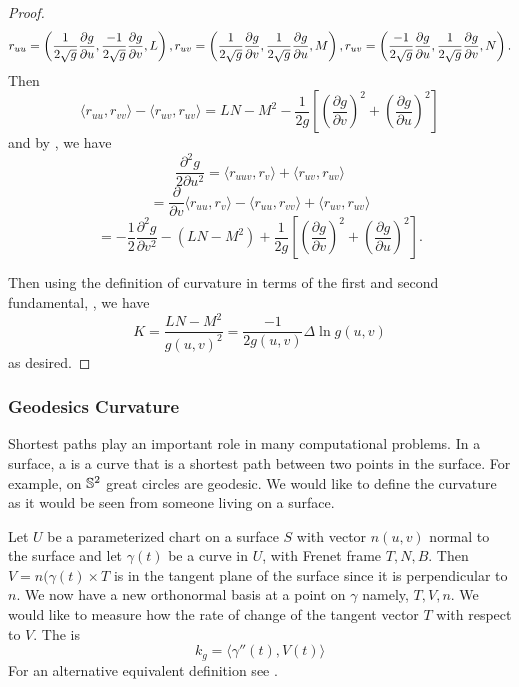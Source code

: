 \begin{proof}
	\begin{equation}\label{eqn:log-curve-proof-seconds}
		r_{uu}=\left(\frac{1}{2\sqrt{g}}\frac{\partial g}{\partial u},\frac{-1}{2\sqrt{g}}\frac{\partial g}{\partial v},L\right),\\
		r_{uv}=\left(\frac{1}{2\sqrt{g}}\frac{\partial g}{\partial v},\frac{1}{2\sqrt{g}}\frac{\partial g}{\partial u},M\right),\\
		r_{uv}=\left(\frac{-1}{2\sqrt{g}}\frac{\partial g}{\partial u},\frac{1}{2\sqrt{g}}\frac{\partial g}{\partial v},N\right).
	\end{equation}
	Then
	$$\langle r_{uu},r_{vv}\rangle -\langle r_{uv},r_{uv}\rangle=LN-M^2-\frac{1}{2g}\left[\left(\frac{\partial g}{\partial v}\right)^2+
	\left(\frac{\partial g}{\partial u}\right)^2\right]$$
	and by , we have
	$$\frac{\partial^2 g}{2\partial u^2}=\langle r_{uuv},r_{v}\rangle+\langle r_{uv},r_{uv}\rangle$$
	$$=\frac{\partial}{\partial v}\langle r_{uu},r_{v}\rangle - \langle r_{uu},r_{vv}\rangle+\langle r_{uv},r_{uv}\rangle$$
	$$=-\frac{1}{2}\frac{\partial^2 g}{\partial v^2}-(LN-M^2)+\frac{1}{2g}\left[\left(\frac{\partial g}{\partial v}\right)^2+
	\left(\frac{\partial g}{\partial u}\right)^2\right].$$
	
	Then using the definition of curvature in terms of the first and second fundamental, ,
	we have
	$$K=\frac{LN-M^2}{g(u,v)^2}=\frac{-1}{2g(u,v)}\Delta \ln g(u,v)$$
	as desired.
\end{proof}

\subsubsection{Geodesics Curvature}

Shortest paths play an important role in many computational problems.
In a surface, a  is a curve that is a shortest path
between two points in the surface. 
For example, on $\mathbb{S}^2$ great circles are geodesic.
We would like to define the curvature as it would be seen from
someone living on a surface.

Let $U$ be a parameterized chart on a surface $S$ with vector $n(u,v)$ normal
to the surface
and let $\gamma(t)$ be a curve in $U$, with Frenet frame $T,N,B$.
Then $V=n(\gamma(t)\times T$ is in the tangent plane of the surface since
it is perpendicular to $n$. We now have a new orthonormal basis at a point on $\gamma$
namely, $T,V,n$. 
We would like to measure how the rate of change of the tangent vector $T$ with respect to $V$.
The  is  
\begin{equation} \label{eqn:geodesic}
	k_g=\langle \gamma''(t),V(t)\rangle
\end{equation}
For an alternative equivalent definition see \cite{doc76}.



